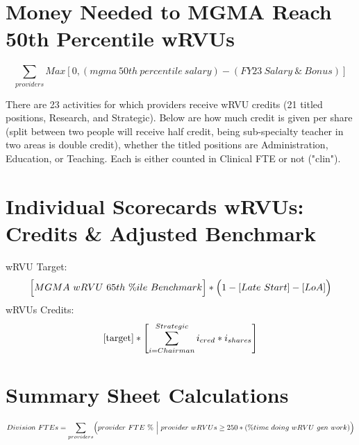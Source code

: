 \documentclass{article}
\begin{document}

	\section{Money Needed to MGMA Reach 50th Percentile wRVUs} %
		\begin{equation*}
			\sum_{providers} Max[0, (mgma \ 50th \ percentile \ salary) - (FY23 \ Salary \ \& \ Bonus)] 
		\end{equation*}

		There are 23 activities for which providers receive wRVU credits (21 titled positions, Research, and Strategic).  Below are how much credit is given per share (split between two people will receive half credit, being sub-specialty teacher in two areas is double credit), whether the titled positions are Administration, Education, or Teaching. Each is either counted in Clinical FTE or not ("clin").
		

	\section{Individual Scorecards wRVUs: Credits \& Adjusted Benchmark} %
		wRVU Target:
		\begin{equation}\label{target}
			\Bigl[ MGMA \ wRVU \ 65th \ \%ile \ Benchmark \Bigr]* \Bigl( 1 - [Late \ Start] - [LoA]\Bigr) 
		\end{equation}
		wRVUs Credits:
		\begin{equation*}
			\eqref{target} * \Biggl[ \sum_{i=Chairman}^{Strategic} i_{cred} * i_{shares} \Biggr] 
		\end{equation*}
	
	\section{Summary Sheet Calculations}
		\begin{equation*}
			Division \ FTEs = \sum_{providers} \Bigl(provider \ FTE \ \% \ \Big| \ provider \ wRVUs \ge 250*(\% time \ doing \ wRVU \ gen \ work) \Bigr)
		\end{equation*} 
\end{document}
